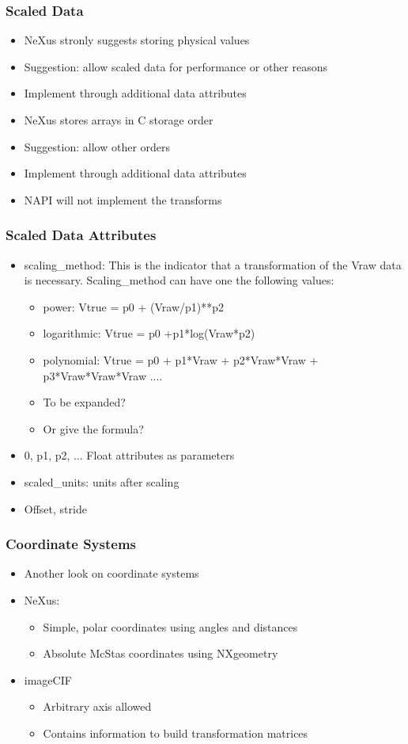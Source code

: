 \documentclass{beamer}
\begin{document}
\begin{frame} \frametitle{Scaled Data}
\begin{itemize}
\item NeXus stronly suggests storing physical values
\item Suggestion: allow scaled data for performance or other reasons
\item Implement through additional data attributes
\item NeXus stores arrays in C storage order
\item Suggestion: allow other orders
\item Implement through additional data attributes
\item NAPI will not implement the transforms
\end{itemize}
\end{frame}

\begin{frame} \frametitle{Scaled Data Attributes}
\begin{itemize}
\item scaling\_method: This is the indicator that a transformation of the Vraw data is 
   necessary. Scaling\_method can have one the following values:
\begin{itemize}
\item power: Vtrue = p0 + (Vraw/p1)**p2
\item logarithmic: Vtrue = p0 +p1*log(Vraw*p2)   
\item  polynomial: Vtrue = p0 + p1*Vraw + p2*Vraw*Vraw + p3*Vraw*Vraw*Vraw ....
\item To be expanded?
\item Or give the formula?
\end{itemize}
\item 0, p1, p2, ... Float attributes as parameters
\item scaled\_units: units after scaling
\item Offset, stride
\end{itemize}
\end{frame}


\begin{frame} \frametitle{Coordinate Systems}
\begin{itemize}
\item Another look on coordinate systems
\item NeXus:
\begin{itemize}
\item Simple, polar coordinates using angles and distances
\item Absolute McStas coordinates using NXgeometry
\end{itemize}
\item imageCIF
\begin{itemize}
\item Arbitrary axis allowed
\item Contains information to build transformation matrices
\end{itemize}
\end{itemize}
\end{frame}
\end{document}

